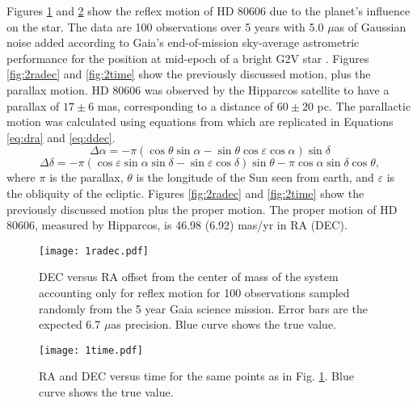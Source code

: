 \documentclass[preprint]{aastex}
\begin{document}
Figures \ref{fig:1radec} and \ref{fig:1time} show the reflex motion of HD 80606 due to the planet's influence on the star. The data are 100 observations over 5 years with 5.0 $\mu$as of Gaussian noise added according to Gaia's end-of-mission sky-average astrometric performance for the position at mid-epoch of a bright G2V star \citep{gaia}. 
Figures \ref{fig:2radec} and \ref{fig:2time} show the previously discussed motion, plus the parallax motion. HD 80606 was observed by the Hipparcos satellite to have a parallax of $17\pm6$ mas, corresponding to a distance of $60\pm20$ pc. The parallactic motion was calculated using equations from \citet{parallax} which are replicated in Equations \ref{eq:dra} and \ref{eq:ddec}. 
\begin{equation}
    \Delta\alpha=-\pi(\cos\theta\sin\alpha-\sin\theta\cos\varepsilon\cos\alpha)\sin\delta
    \label{eq:dra}
\end{equation}
\begin{equation}
    \Delta\delta=-\pi(\cos\varepsilon\sin\alpha\sin\delta-\sin\varepsilon\cos\delta)\sin\theta-\pi\cos\alpha\sin\delta\cos\theta,
    \label{eq:ddec}
\end{equation}
where $\pi$ is the parallax, $\theta$ is the longitude of the Sun seen from earth, and $\varepsilon$ is the obliquity of the ecliptic.
Figures \ref{fig:2radec} and \ref{fig:2time} show the previously discussed motion plus the proper motion. The proper motion of HD 80606, measured by Hipparcos, is 46.98 (6.92) mas/yr in RA (DEC).

\begin{figure}
\begin{center}
    \texttt{[image: 1radec.pdf]}
    \caption{DEC versus RA offset from the center of mass of the system accounting only for reflex motion for 100 observations sampled randomly from the 5 year Gaia science mission. Error bars are the expected 6.7 $\mu$as precision. Blue curve shows the true value.}
    \label{fig:1radec}
\end{center}
\end{figure}

\begin{figure}
\begin{center}
    \texttt{[image: 1time.pdf]}
    \caption{RA and DEC versus time for the same points as in Fig. \ref{fig:1radec}. Blue curve shows the true value.}
    \label{fig:1time}
\end{center}
\end{figure}
\end{document}

